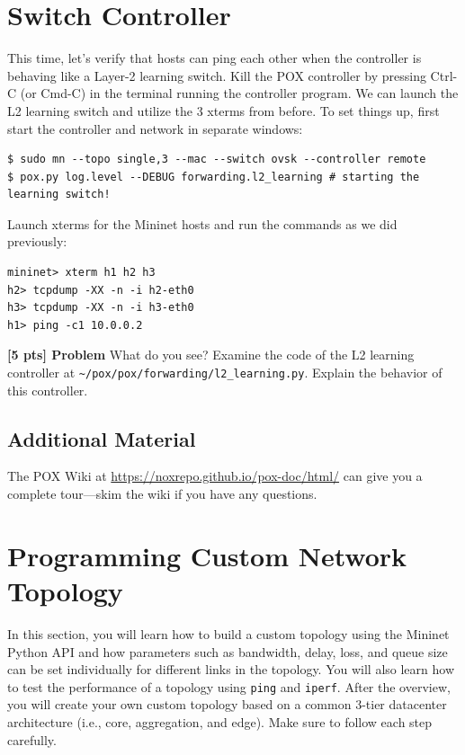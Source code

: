\documentclass{article}
\newcounter{QuestionCounter}
\newcommand{\questionbox}[2]{
\stepcounter{QuestionCounter}
\begin{framed}
\noindent
\textbf{[#1 pts] Problem \arabic{QuestionCounter}}
\vspace{5pt}
\newline
\noindent#2
\end{framed}
}
\begin{document}
\section{Switch Controller}
This time, let's verify that hosts can ping each other when the controller is behaving like a Layer-2 learning switch.
Kill the POX controller by pressing Ctrl-C (or Cmd-C) in the terminal running the controller program.
We can launch the L2 learning switch and utilize the 3 xterms from before.
To set things up, first start the controller and network in separate windows:

\begin{topbot}
\begin{verbatim}
$ sudo mn --topo single,3 --mac --switch ovsk --controller remote
$ pox.py log.level --DEBUG forwarding.l2_learning # starting the learning switch!
\end{verbatim}
\end{topbot}

Launch xterms for the Mininet hosts and run the commands as we did previously:
\begin{topbot}
\begin{verbatim}
mininet> xterm h1 h2 h3
h2> tcpdump -XX -n -i h2-eth0
h3> tcpdump -XX -n -i h3-eth0
h1> ping -c1 10.0.0.2
\end{verbatim}
\end{topbot}

\questionbox{5}{
What do you see?
Examine the code of the L2 learning controller at\newline
\nolinkurl{~/pox/pox/forwarding/l2_learning.py}.
Explain the behavior of this controller.
}

\subsection*{Additional Material}
The POX Wiki at \url{https://noxrepo.github.io/pox-doc/html/} can give you a complete tour---skim the wiki if you have any questions.

\section{Programming Custom Network Topology}
In this section, you will learn how to build a custom topology using the Mininet Python API and how parameters such as bandwidth, delay, loss, and queue size can be set individually for different links in the topology.
You will also learn how to test the performance of a topology using \texttt{ping} and \texttt{iperf}.
After the overview, you will create your own custom topology based on a common 3-tier datacenter architecture (i.e., core, aggregation, and edge).
Make sure to follow each step carefully.
\end{document}
